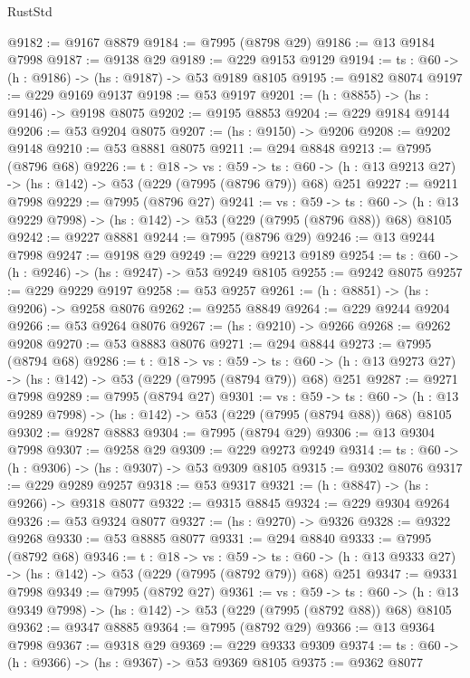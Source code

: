 \begin{lexlean}{RustStd}
\begin{coremodule}
@9182 := @9167 @8879
@9184 := @7995 (@8798 @29)
@9186 := @13 @9184 @7998
@9187 := @9138 @29
@9189 := @229 @9153 @9129
@9194 := {ts : @60} -> (h : @9186) -> (hs : @9187) -> @53 @9189 @8105
@9195 := @9182 @8074
@9197 := @229 @9169 @9137
@9198 := @53 @9197
@9201 := (h : @8855) -> (hs : @9146) -> @9198 @8075
@9202 := @9195 @8853
@9204 := @229 @9184 @9144
@9206 := @53 @9204 @8075
@9207 := (hs : @9150) -> @9206
@9208 := @9202 @9148
@9210 := @53 @8881 @8075
@9211 := @294 @8848
@9213 := @7995 (@8796 @68)
@9226 := {t : @18} ->
  {vs : @59} ->
  {ts : @60} -> (h : @13 @9213 @27) -> (hs : @142) -> @53 (@229 (@7995 (@8796 @79)) @68) @251
@9227 := @9211 @7998
@9229 := @7995 (@8796 @27)
@9241 := {vs : @59} ->
  {ts : @60} -> (h : @13 @9229 @7998) -> (hs : @142) -> @53 (@229 (@7995 (@8796 @88)) @68) @8105
@9242 := @9227 @8881
@9244 := @7995 (@8796 @29)
@9246 := @13 @9244 @7998
@9247 := @9198 @29
@9249 := @229 @9213 @9189
@9254 := {ts : @60} -> (h : @9246) -> (hs : @9247) -> @53 @9249 @8105
@9255 := @9242 @8075
@9257 := @229 @9229 @9197
@9258 := @53 @9257
@9261 := (h : @8851) -> (hs : @9206) -> @9258 @8076
@9262 := @9255 @8849
@9264 := @229 @9244 @9204
@9266 := @53 @9264 @8076
@9267 := (hs : @9210) -> @9266
@9268 := @9262 @9208
@9270 := @53 @8883 @8076
@9271 := @294 @8844
@9273 := @7995 (@8794 @68)
@9286 := {t : @18} ->
  {vs : @59} ->
  {ts : @60} -> (h : @13 @9273 @27) -> (hs : @142) -> @53 (@229 (@7995 (@8794 @79)) @68) @251
@9287 := @9271 @7998
@9289 := @7995 (@8794 @27)
@9301 := {vs : @59} ->
  {ts : @60} -> (h : @13 @9289 @7998) -> (hs : @142) -> @53 (@229 (@7995 (@8794 @88)) @68) @8105
@9302 := @9287 @8883
@9304 := @7995 (@8794 @29)
@9306 := @13 @9304 @7998
@9307 := @9258 @29
@9309 := @229 @9273 @9249
@9314 := {ts : @60} -> (h : @9306) -> (hs : @9307) -> @53 @9309 @8105
@9315 := @9302 @8076
@9317 := @229 @9289 @9257
@9318 := @53 @9317
@9321 := (h : @8847) -> (hs : @9266) -> @9318 @8077
@9322 := @9315 @8845
@9324 := @229 @9304 @9264
@9326 := @53 @9324 @8077
@9327 := (hs : @9270) -> @9326
@9328 := @9322 @9268
@9330 := @53 @8885 @8077
@9331 := @294 @8840
@9333 := @7995 (@8792 @68)
@9346 := {t : @18} ->
  {vs : @59} ->
  {ts : @60} -> (h : @13 @9333 @27) -> (hs : @142) -> @53 (@229 (@7995 (@8792 @79)) @68) @251
@9347 := @9331 @7998
@9349 := @7995 (@8792 @27)
@9361 := {vs : @59} ->
  {ts : @60} -> (h : @13 @9349 @7998) -> (hs : @142) -> @53 (@229 (@7995 (@8792 @88)) @68) @8105
@9362 := @9347 @8885
@9364 := @7995 (@8792 @29)
@9366 := @13 @9364 @7998
@9367 := @9318 @29
@9369 := @229 @9333 @9309
@9374 := {ts : @60} -> (h : @9366) -> (hs : @9367) -> @53 @9369 @8105
@9375 := @9362 @8077

\end{coremodule}
\end{lexlean}
